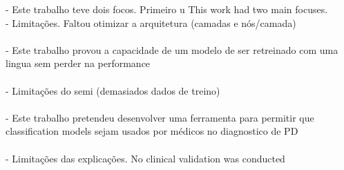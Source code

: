  - Este trabalho teve dois focos. Primeiro u
 This work had two main focuses.
 \\
 - Limitações. Faltou otimizar a arquitetura (camadas e nós/camada) \\
\\
 - Este trabalho provou a capacidade de um modelo de ser retreinado com uma lingua sem perder na performance \\
 \\
 - Limitações do semi (demasiados dados de treino) \\
 \\
 - Este trabalho pretendeu desenvolver uma ferramenta para permitir que classification models sejam usados por médicos no diagnostico de PD \\
 \\
 - Limitações das explicações. No clinical validation was conducted \\
 
